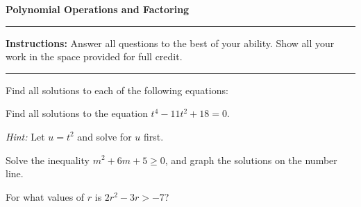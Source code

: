 \documentclass[12pt]{exam}
\newcommand{\examtitle}{Polynomial Operations and Factoring}
\newcommand{\instructions}{
    \noindent\rule{\textwidth}{0.5pt}
    \begin{center}
    \textbf{Instructions:} Answer all questions to the best of your ability. Show all your work in the space provided for full credit.
    \end{center}
    \noindent\rule{\textwidth}{0.5pt}
}
\begin{document}
\begin{center}
\textbf{\Large \examtitle} \\
\vspace{0.5cm}
\hspace{0.1\textwidth}
\end{center}

\instructions
\vspace{0.5cm}

\begin{questions}

\pointsinrightmargin

\question[10]
Find all solutions to each of the following equations:

\question[8]
Find all solutions to the equation $t^4 - 11t^2 + 18 = 0$.

\textit{Hint:} Let $u = t^2$ and solve for $u$ first.
\vspace*{4cm}

\question[10]
Solve the inequality $m^2 + 6m + 5 \geq 0$, and graph the solutions on the number line.
\vspace*{5cm}

\newpage

\question[8]
For what values of $r$ is $2r^2 - 3r > -7$?
\vspace*{4cm}


\end{questions}
\end{document}
